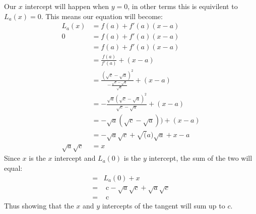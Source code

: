 \documentclass[11pt]{article}
\begin{document}
Our $x$ intercept will happen when $y = 0$, in other terms this is equivilent to $L_a(x) = 0$. This means our equation will become:
\begin{align*}
 L_a(x) & = f(a) + f'(a)(x-a)\\
0 & = f(a) + f'(a)(x-a)\\
 & = f(a) + f'(a)(x-a)\\
& = \frac{f(a)}{f'(a)} + (x - a)\\ 
& = \frac{(\sqrt{c}-\sqrt{a})^2 }{ -\frac{\sqrt{c}-\sqrt{a}}{\sqrt{a}}} + (x - a)\\
& = -\frac{\sqrt{a}(\sqrt{c}-\sqrt{a})^2}{\sqrt{c}-\sqrt{a}} + (x - a) \\
& = -\sqrt{a}(\sqrt{c}-\sqrt{a})) + (x - a) \\
& = -\sqrt{a}\sqrt{c} +\sqrt(a)\sqrt{a} + x - a \\
\sqrt{a}\sqrt{c} & =   x  
\end{align*}
Since $x$ is the $x$ intercept and $L_a(0)$ is the $y$ intercept, the sum of the two will equal:
\begin{align*}
= & L_a(0)  + x\\
= &  \text{ c} - \sqrt{a}\sqrt{c} +\sqrt{a}\sqrt{c} \\
= & \text{ c} 
\end{align*}
Thus showing that the $x$ and $y$ intercepts of the tangent will sum up to $c$.
\end{document}
